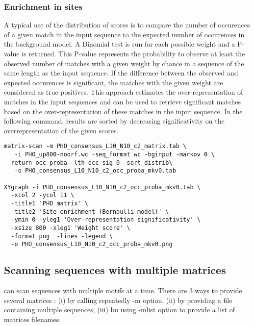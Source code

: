 \subsubsection{Enrichment in sites}

A typical use of the distribution of scores is to compare the number of occurences of a given match in the input sequence to the expected number of occurences in the background model. A Binomial test is run for each possible weight and a P-value is returned. This P-value represents the probability to observe at least the observed number of matches with a given weight by chance in a sequence of the same length as the input sequence. If the difference between the observed and expected occurences is significant, the matches with the given weight are considered as true positives. This approach estimates the over-representation of matches in the input sequences and can be used to retrieve significant matches based on the over-representation of these matches in the input sequence. In the following command, results are sorted by decreasing significativity on the overrepresentation of the given scores.

{\color{Blue} \begin{footnotesize} 
\begin{verbatim}
matrix-scan -m PHO_consensus_L10_N10_c2_matrix.tab \
   -i PHO_up800-noorf.wc -seq_format wc -bginput -markov 0 \
 -return occ_proba -lth occ_sig 0 -sort_distrib\
   -o PHO_consensus_L10_N10_c2_occ_proba_mkv0.tab
   
XYgraph -i PHO_consensus_L10_N10_c2_occ_proba_mkv0.tab \
  -xcol 2 -ycol 11 \
  -title1 'PHO matrix' \
  -title2 'Site enrichment (Bernoulli model)' \
  -ymin 0 -yleg1 'Over-representation significativity' \
  -xsize 800 -xleg1 'Weight score' \
  -format png  -lines -legend \
  -o PHO_consensus_L10_N10_c2_occ_proba_mkv0.png

\end{verbatim} \end{footnotesize}
}

\subsection{Scanning sequences with multiple matrices}
\program{matrix-scan}  can scan sequences with multiple motifs at a time. There are 3 ways to provide several matrices : (i) by calling repeatedly -m option, (ii) by providing a file containing multiple sequences, (iii) bu using -mlist option to provide a list of matrices filenames.

